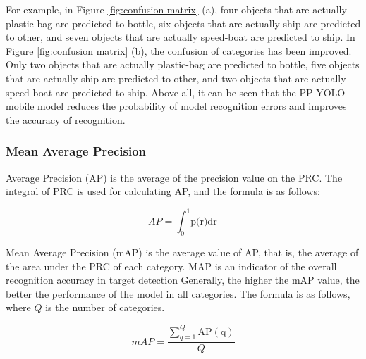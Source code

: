 \documentclass[sensors,article,submit,moreauthors,pdftex]{Definitions/mdpi}
\begin{document}
\begin{paracol}{2}
For example, in Figure \ref{fig:confusion matrix} (a), four objects that are actually plastic-bag are predicted to bottle, six objects that are actually ship are predicted to other, and seven objects that are actually speed-boat are predicted to ship. In Figure \ref{fig:confusion matrix} (b), the confusion of categories has been improved. Only two objects that are actually plastic-bag are predicted to bottle, five objects that are actually ship are predicted to other, and two objects that are actually speed-boat are predicted to ship. Above all, it can be seen that the PP-YOLO-mobile model reduces the probability of model recognition errors and improves the accuracy of recognition.





\subsubsection{Mean Average Precision}
Average Precision (AP) is the average of the precision value on the PRC. The integral of PRC is used for calculating AP, and the formula is as follows:

\begin{equation} 
{AP} = {\int_{0}^{1}\text{p(r)dr}} 
\end{equation}

Mean Average Precision (mAP) is the average value of AP, that is, the average of the area under the PRC of each category. MAP is an indicator of the overall recognition accuracy in target detection Generally, the higher the mAP value, the better the performance of the model in all categories. The formula is as follows, where $Q$ is the number of categories.

\begin{equation} 
{mAP} = {\frac {\sum _{q=1}^{Q}\operatorname {AP(q)} }{Q}}
\end{equation}


\end{paracol}
\end{document}
